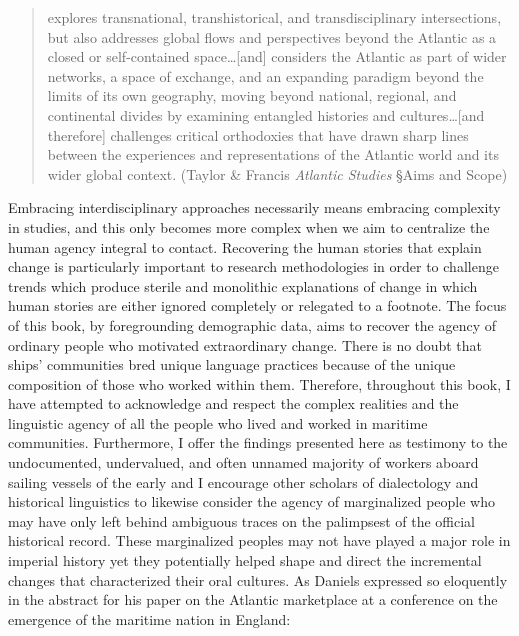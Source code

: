 \begin{quotation}
explores transnational, transhistorical, and transdisciplinary intersections, but also addresses global flows and perspectives beyond the Atlantic as a closed or self-contained space…[and] considers the Atlantic as part of wider networks, a space of exchange, and an expanding paradigm beyond the limits of its own geography, moving beyond national, regional, and continental divides by examining entangled histories and cultures…[and therefore] challenges critical orthodoxies that have drawn sharp lines between the experiences and representations of the Atlantic world and its wider global context. (Taylor \& Francis \citealt{Group2016} \textit{Atlantic Studies} §Aims and Scope)
\end{quotation}

Embracing interdisciplinary approaches necessarily means embracing complexity in  studies, and this only becomes more complex when we aim to centralize the human agency integral to  contact. Recovering the human stories that explain  change is particularly important to  research methodologies in order to challenge trends which produce sterile and monolithic explanations of  change in which human stories are either ignored completely or relegated to a footnote. The focus of this book, by foregrounding demographic data, aims to recover the agency of ordinary people who motivated extraordinary change. There is no doubt that ships’ communities bred unique language practices because of the unique composition of those who worked within them. Therefore, throughout this book, I have attempted to acknowledge and respect the complex realities and the linguistic agency of all the people who lived and worked in maritime communities. Furthermore, I offer the findings presented here as testimony to the undocumented, undervalued, and often unnamed majority of workers aboard sailing vessels of the early  and I encourage other scholars of dialectology and historical linguistics to likewise consider the agency of marginalized people who may have only left behind ambiguous traces on the palimpsest of the official historical record. These marginalized peoples may not have played a major role in imperial history yet they potentially helped shape and direct the incremental changes that characterized their oral cultures. As Daniels expressed so eloquently in the abstract for his paper on the Atlantic marketplace at a conference on the emergence of the maritime nation in England:

